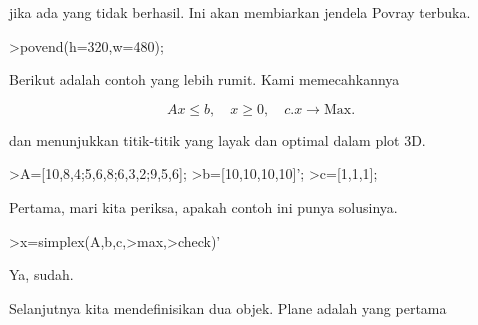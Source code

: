 \documentclass{article}
\begin{document}
\begin{eulernotebook}
\begin{eulercomment}
jika ada yang tidak berhasil. Ini akan membiarkan jendela Povray
terbuka.
\end{eulercomment}
\begin{eulerprompt}
>povend(h=320,w=480);
\end{eulerprompt}
\begin{eulercomment}
Berikut adalah contoh yang lebih rumit. Kami memecahkannya

\end{eulercomment}
\begin{eulerformula}
\[
Ax \le b, \quad x \ge 0, \quad c.x \to \text{Max.}
\]
\end{eulerformula}
\begin{eulercomment}
dan menunjukkan titik-titik yang layak dan optimal dalam plot 3D.
\end{eulercomment}
\begin{eulerprompt}
>A=[10,8,4;5,6,8;6,3,2;9,5,6];
>b=[10,10,10,10]';
>c=[1,1,1];
\end{eulerprompt}
\begin{eulercomment}
Pertama, mari kita periksa, apakah contoh ini punya solusinya.
\end{eulercomment}
\begin{eulerprompt}
>x=simplex(A,b,c,>max,>check)'
\end{eulerprompt}
\begin{euleroutput}
  [0,  1,  0.5]
\end{euleroutput}
\begin{eulercomment}
Ya, sudah.

Selanjutnya kita mendefinisikan dua objek. Plane adalah yang pertama


\end{eulercomment}
\end{eulernotebook}
\end{document}
